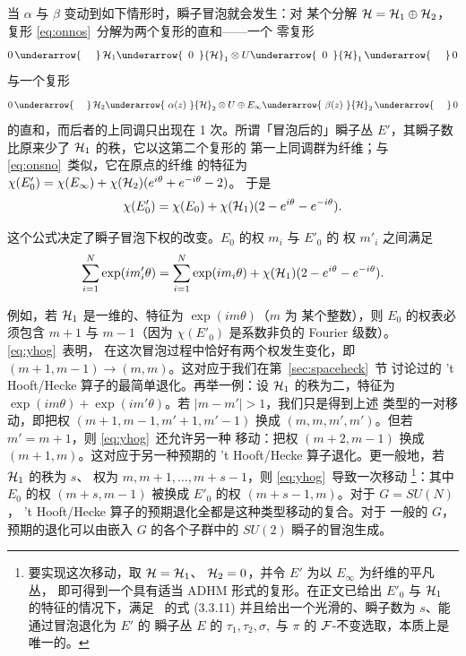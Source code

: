当 $\alpha$ 与 $\beta $ 变动到如下情形时，瞬子冒泡就会发生：对
某个分解 ${{{\mathcal{H}}}}={{{\mathcal{H}}}}_1\oplus
{{{\mathcal{H}}}}_2$，复形 \eqref{eq:onnos}\ 分解为两个复形的直和——一个
零复形 %
\setcounter{equation}{9}
\begin{equation}\label{eq:teto}
0\,\underarrow{~~~~}\,
{{\EUH}}_1\underarrow{\,\,\,0\,\,\,}{{\EUH}}_1\otimes
U\underarrow{\,\,\,0\,\,\,}{{\EUH}}_1\,\underarrow{~~~~}\, 0
\end{equation}
 与一个复形
\setcounter{equation}{10}
\begin{equation}\label{eq:ponos}
0\,\underarrow{~~~~}\,{{\EUH}}_2\underarrow{\,\,\alpha(z)\,\,}{{\EUH}}_2\otimes
U\oplus E_\infty\underarrow{\,\,\beta(z)\,\,}
{{\EUH}}_2\,\underarrow{~~~~}\, 0
\end{equation}
 的直和，而后者的上同调只出现在 1 次。所谓「冒泡后的」瞬子丛
$E'$，其瞬子数比原来少了 ${{{\mathcal{H}}}}_1$ 的秩，它以这第二个复形的
第一上同调群为纤维；与 \eqref{eq:onsno}\ 类似，它在原点的纤维
的特征为
$\chi(E'_0)=\chi(E_\infty)+\chi({{{\mathcal{H}}}}_2)(e^{i\theta}+e^{-i\theta}-2)$。
于是
\setcounter{equation}{11}
\begin{equation}\label{eq:ponzo}
\chi(E'_0)=\chi(E_0)+\chi({{{\mathcal{H}}}}_1)(2-e^{i\theta}-e^{-i\theta}).
\end{equation}

这个公式决定了瞬子冒泡下权的改变。$E_0$ 的权 $m_i$ 与 $E'_0$ 的
权 $m'_i$ 之间满足
\setcounter{equation}{12}
\begin{equation}\label{eq:yhog}
\sum_{i=1}^N\exp({im'_i\theta})=
\sum_{i=1}^N\exp({im_i\theta})+\chi({{{\mathcal{H}}}}_1)(2-e^{i\theta}-e^{-i\theta}).
\end{equation}

例如，若 ${{{\mathcal{H}}}}_1$ 是一维的、特征为 $\exp(im\theta)$（$m$ 为
某个整数），则 $E_0$ 的权表必须包含 $m+1$ 与 $m-1$（因为
$\chi(E'_0)$ 是系数非负的 Fourier 级数）。\eqref{eq:yhog}\ 表明，
在这次冒泡过程中恰好有两个权发生变化，即
$(m+1,m-1)\to (m,m)$。这对应于我们在第~\ref{sec:spaceheck}~节
讨论过的 't Hooft/Hecke 算子的最简单退化。再举一例：设
${{{\mathcal{H}}}}_1$ 的秩为二，特征为 $\exp({im
\theta})+\exp({im'\theta})$。若 $|m-m'|>1$，我们只是得到上述
类型的一对移动，即把权 $(m+1,m-1,m'+1,m'-1)$ 换成
$(m,m,m',m')$。但若 $m'=m+1$，则 \eqref{eq:yhog}\ 还允许另一种
移动：把权 $(m+2,m-1)$ 换成 $(m+1,m)$。这对应于另一种预期的
't Hooft/Hecke 算子退化。更一般地，若 ${{{\mathcal{H}}}}_1$ 的秩为 $s$、
权为 $m,m+1,\dots,m+s-1$，则 \eqref{eq:yhog}\ 导致一次移动%
\footnote{要实现这次移动，取 ${{{\mathcal{H}}}}={{{\mathcal{H}}}}_1$、
${{{\mathcal{H}}}}_2=0$，并令 $E'$ 为以 $E_\infty$ 为纤维的平凡丛，
即可得到一个具有适当 ADHM 形式的复形。在正文已给出 $E'_0$ 与
${{{\mathcal{H}}}}_1$ 的特征的情况下，满足 \cite{ref126}\ 的式 (3.3.11)
并且给出一个光滑的、瞬子数为 $s$、能通过冒泡退化为 $E'$ 的
瞬子丛 $E$ 的 $\tau_1,\tau_2,\sigma,$ 与 $\pi$ 的
${{\mathcal{F}}}$-不变选取，本质上是唯一的。}：其中 $E_0$ 的权
$(m+s,m-1)$ 被换成 $E'_0$ 的权 $(m+s-1,m)$。对于 $G=SU(N)$，
't Hooft/Hecke 算子的预期退化全都是这种类型移动的复合。对于
一般的 $G$，预期的退化可以由嵌入 $G$ 的各个子群中的 $SU(2)$
瞬子的冒泡生成。

